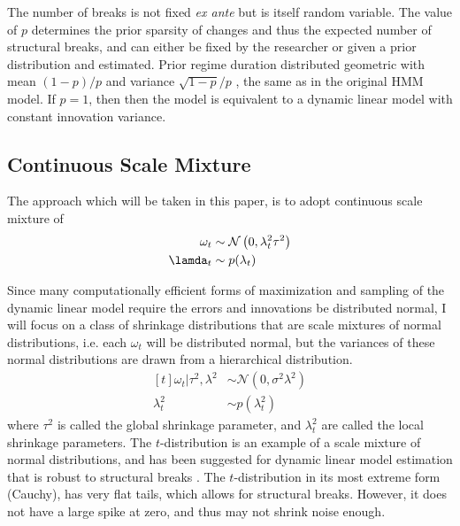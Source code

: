 \documentclass{article}
\newcommand{\paren}[1]{\ensuremath{\left(#1\right)}}
\newcommand{\dnorm}[1]{\ensuremath{\mathcal{N}\paren{#1}}}
\begin{document}
The number of breaks is not fixed \textit{ex ante} but is itself random variable.
The value of $p$ determines the prior sparsity of changes and thus the expected number of structural breaks,
and can either be fixed by the researcher or given a prior distribution and estimated.
Prior regime duration distributed geometric with mean $(1 - p) / p$ and variance $\sqrt{1 - p} / p$ \parencite[68]{GiordaniKohn2008}, the same as in the original \textcite{Chib1998} HMM model.
If $p = 1$, then then the model is equivalent to a dynamic linear model with constant innovation variance.

\subsection{Continuous Scale Mixture}
\label{sec:shrinkage}

The approach which will be taken in this paper, is to adopt continuous scale mixture of 
\begin{equation}
  \label{eq:4}
  \begin{aligned}[t]
    \omega_{t} &\sim \dnorm{0, \lambda_{t}^{2} \tau^{2}} \\
    \lamda_{t} &\sim p(\lambda_{t})
  \end{aligned}
\end{equation}

Since many computationally efficient forms of maximization and sampling of the dynamic linear model require the errors and innovations be distributed normal, I will focus on a class of shrinkage distributions that are scale mixtures of normal distributions, i.e. each $\omega_{t}$ will be distributed normal, but the variances of these normal distributions are drawn from a hierarchical distribution.
\begin{equation}
  \label{eq:6}
  \begin{aligned}[t]
    \omega_{t} | \tau^{2}, \lambda^{2} & \sim \dnorm{0, \sigma^{2} \lambda^{2}} \\
    \lambda_{t}^{2} & \sim p(\lambda^{2}_{t})
  \end{aligned}
\end{equation}
where $\tau^{2}$ is called the global shrinkage parameter, and $\lambda_{t}^{2}$ are called the local shrinkage parameters.
The $t$-distribution is an example of a scale mixture of normal distributions, and has been suggested for dynamic linear model estimation that is robust to structural breaks \parencites{HarveyKoopman2000}{PetrisPetroneEtAl2009}.
The $t$-distribution in its most extreme form (Cauchy), has very flat tails, which allows for structural breaks.
However, it does not have a large spike at zero, and thus may not shrink noise enough.
\end{document}
